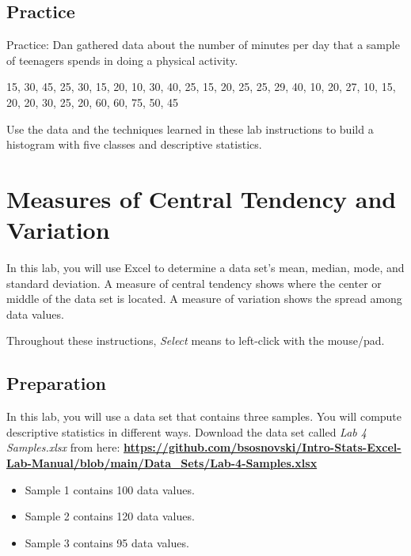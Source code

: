 \documentclass[
]{book}
\providecommand{\tightlist}{%
  \setlength{\itemsep}{0pt}\setlength{\parskip}{0pt}}
\begin{document}
\hypertarget{practice}{%
\section{Practice}\label{practice}}

Practice:
Dan gathered data about the number of minutes per day that a sample of teenagers spends in doing a physical activity.

15, 30, 45, 25, 30, 15, 20, 10, 30, 40, 25, 15, 20, 25, 25, 29, 40, 10, 20, 27, 10, 15, 20, 20, 30, 25, 20, 60, 60, 75, 50, 45

Use the data and the techniques learned in these lab instructions to build a histogram with five classes and descriptive statistics.

\hypertarget{central-tendency-variation}{%
\chapter{Measures of Central Tendency and Variation}\label{central-tendency-variation}}

In this lab, you will use Excel to determine a data set's mean, median, mode, and standard deviation. A measure of central tendency shows where the center or middle of the data set is located. A measure of variation shows the spread among data values.

Throughout these instructions, \emph{Select} means to left-click with the mouse/pad.

\hypertarget{preparation-1}{%
\section{Preparation}\label{preparation-1}}

In this lab, you will use a data set that contains three samples. You will compute descriptive statistics in different ways. Download the data set called \emph{Lab 4 Samples.xlsx} from here: \href{https://github.com/bsosnovski/Intro-Stats-Excel-Lab-Manual/blob/main/Data_Sets/Lab-4-Samples.xlsx}{\textbf{https://github.com/bsosnovski/Intro-Stats-Excel-Lab-Manual/blob/main/Data\_Sets/Lab-4-Samples.xlsx}}

\begin{itemize}
\tightlist
\item
  Sample 1 contains 100 data values.
\item
  Sample 2 contains 120 data values.
\item
  Sample 3 contains 95 data values.
\end{itemize}
\end{document}
